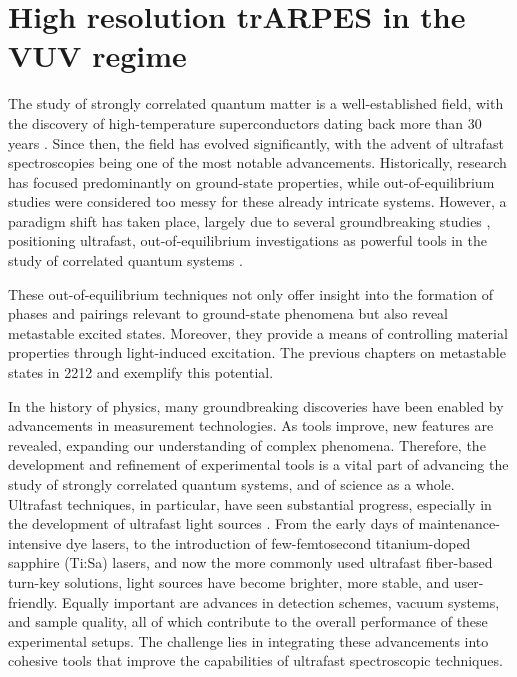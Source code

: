 \chapter{High resolution trARPES in the VUV regime}
\label{ch:vuv}

The study of strongly correlated quantum matter is a well-established field, with the discovery of high-temperature superconductors dating back more than 30 years \cite{bednorz_possible_1986,anderson_resonating_1987}.
Since then, the field has evolved significantly, with the advent of ultrafast spectroscopies being one of the most notable advancements.
Historically, research has focused predominantly on ground-state properties, while out-of-equilibrium studies were considered too messy for these already intricate systems.
However, a paradigm shift has taken place, largely due to several groundbreaking studies \cite{eesley_relaxation_1990, han_femtosecond_1990, giannetti_revealing_2011, smallwood_tracking_2012}, positioning ultrafast, out-of-equilibrium investigations as powerful tools in the study of correlated quantum systems \cite{orenstein_ultrafast_2012, maiuri_ultrafast_2020, boschini_time-resolved_2024, giannetti_ultrafast_2016, lloyd-hughes_2021_2021}.

These out-of-equilibrium techniques not only offer insight into the formation of phases and pairings relevant to ground-state phenomena but also reveal metastable excited states.
Moreover, they provide a means of controlling material properties through light-induced excitation.
The previous chapters on metastable states in 2212 and  exemplify this potential.

In the history of physics, many groundbreaking discoveries have been enabled by advancements in measurement technologies.
As tools improve, new features are revealed, expanding our understanding of complex phenomena.
Therefore, the development and refinement of experimental tools is a vital part of advancing the study of strongly correlated quantum systems, and of science as a whole.
Ultrafast techniques, in particular, have seen substantial progress, especially in the development of ultrafast light sources \cite{keller_recent_2003}.
From the early days of maintenance-intensive dye lasers, to the introduction of few-femtosecond titanium-doped sapphire (Ti:Sa) lasers, and now the more commonly used ultrafast fiber-based turn-key solutions, light sources have become brighter, more stable, and user-friendly.
Equally important are advances in detection schemes, vacuum systems, and sample quality, all of which contribute to the overall performance of these experimental setups.
The challenge lies in integrating these advancements into cohesive tools that improve the capabilities of ultrafast spectroscopic techniques.

